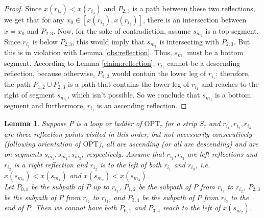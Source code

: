 \documentclass[10pt,a4paper]{amsart}
\theoremstyle{thmstyleone}
\newtheorem{lemma}{Lemma}
\newcommand{\OPT}{{\text{OPT}}}
\begin{document}
\begin{proof}
	Since $x(r_{i_2}) < x(r_{i_3})$ and $P_{2,3}$ is a path between these two reflections, we get that for any $x_0 \in [x(r_{i_2}), x(r_{i_3})]$, there is an intersection between $x = x_0$ and $P_{2,3}$. Now, for the sake of contradiction, assume $s_{m_1}$ is a top segment. Since $r_{i_1}$ is below $P_{2,3}$, this would imply that $s_{m_1}$ is intersecting with $P_{2,3}$. But this is in violation with Lemma \ref{obs:reflection}. Thus, $s_{m_1}$ must be a bottom segment. According to Lemma \ref{claim:reflection}, $r_{i_1}$ cannot be a descending reflection, because otherwise, $P_{1,2}$ would contain the lower leg of $r_{i_1}$; therefore, the path $P_{1,2}\cup P_{2,3}$ is a path that contains the lower leg of $r_{i_1}$ and reaches to the right of segment $s_{m_1}$, which isn't possible.
	So we conclude that $s_{m_1}$ is a bottom segment and furthermore, $r_{i_1}$ is an ascending reflection.
\end{proof}
\begin{lemma}\label{lem:reflection-M}
    Suppose $P$ is a loop or ladder of $\OPT_\tau$ for a strip $S_\tau$ and $r_{i_1},r_{i_2},r_{i_3}$ are three reflection points
    visited in this order, but not necessarily consecutively (following orientation of $\OPT$), all are ascending (or all are descending) and are on segments $s_{m_1},s_{m_2},s_{m_3}$, respectively. Assume that $r_{i_1},r_{i_3}$ are left reflections and $r_{i_2}$ is a right reflection
    and $r_{i_2}$ is to the left of both $r_{i_1}$ and $r_{i_3}$, i.e. $x(s_{m_2})<x(s_{m_1})$ and $x(s_{m_2})< x(s_{m_3})$.\\
    Let $P_{0,1}$ be the subpath of $P$ up to $r_{i_1}$, $P_{1,2}$ be the subpath of $P$ from $r_{i_1}$ to $r_{i_2}$, $P_{2,3}$ be the subpath of $P$
    from $r_{i_2}$ to $r_{i_3}$, and $P_{3,4}$ be the subpath of $P$ from $r_{i_3}$ to the end of $P$.
    Then we cannot have both $P_{0,1}$ and $P_{3,4}$ reach to the left of $x(s_{m_2})$.
\end{lemma}
\end{document}

